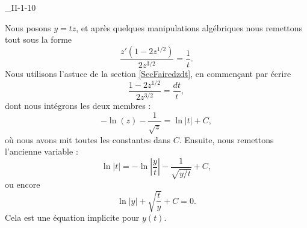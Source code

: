 \begin{corrige}{_II-1-10}
\begin{enumerate}
Nous posons $y=tz$, et après quelques manipulations algébriques nous remettons tout sous la forme
\begin{equation}		\label{EqII110EqPourz}
	\frac{ z'(1-2z^{1/2}) }{ 2z^{3/2} }=\frac{1}{ t }.
\end{equation}
Nous utilisons l'astuce de la section \ref{SecFairedzdt}, en commençant par écrire
\begin{equation}
	\frac{ 1-2z^{1/2} }{ 2z^{3/2} }=\frac{ dt }{ t },
\end{equation}
dont nous intégrons les deux membres :
\begin{equation}
	-\ln(z)-\frac{1}{ \sqrt{z} }=\ln| t |+C,
\end{equation}
où nous avons mit toutes les constantes dans $C$.
Ensuite, nous remettons l'ancienne variable :
\begin{equation}
	\ln| t |=-\ln| \frac{ y }{ t } |-\frac{1}{ \sqrt{y/t} }+C,
\end{equation}
ou encore
\begin{equation}
	\ln| y |+\sqrt{\frac{ t }{ y }}+C=0.
\end{equation}
Cela est une équation implicite pour $y(t)$.

\end{enumerate}


\end{corrige}
